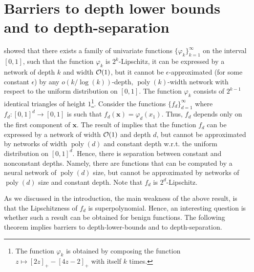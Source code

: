 \documentclass[11pt]{article}
\newcommand{\bx}{\mathbf{x}}
\newcommand{\co}{{\cal O}}
\DeclareMathOperator{\poly}{poly}
\begin{document}
\section{Barriers to depth lower bounds and to depth-separation}
\label{sec:barriers depth}

\cite{telgarsky2016benefits} showed that there exists a family of univariate functions $\{\varphi_k\}_{k=1}^\infty$ on the interval $[0,1]$, such that the function $\varphi_k$ is $2^k$-Lipschitz, it can be expressed by a network of depth $k$ and width $\co(1)$, but it cannot be $\epsilon$-approximated (for some constant $\epsilon$) by any $o(k/\log(k))$-depth, $\poly(k)$-width network with respect to the uniform distribution on $[0,1]$.
The function $\varphi_k$ consists of $2^{k-1}$ identical triangles of height $1$\footnote{The function $\varphi_k$ is obtained by composing the function $z \mapsto [2z]_+ - [4z-2]_+$ with itself $k$ times.}.
Consider the functions $\{f_d\}_{d=1}^\infty$ where $f_d:[0,1]^d \rightarrow [0,1]$ is such that $f_d(\bx) = \varphi_d(x_1)$. Thus, $f_d$ depends only on the first component of $\bx$.
The result of \cite{telgarsky2016benefits} implies that the function $f_d$ can be expressed by a network of width $\co(1)$ and depth $d$, but cannot be approximated by networks of width $\poly(d)$ and constant depth w.r.t. the uniform distribution on $[0,1]^d$. Hence, there is separation between constant and nonconstant depths. Namely, there are functions that can be computed by a neural network of $\poly(d)$ size, but cannot be approximated by networks of $\poly(d)$ size and constant depth. 
Note that $f_d$ is $2^d$-Lipschitz.


As we discussed in the introduction, the main weakness of the above result, is that the Lipschitzness of $f_d$ is superpolynomial. 
Hence, an interesting question is whether such a result can be obtained for benign functions. 
The following theorem implies barriers to depth-lower-bounds and to depth-separation.
\end{document}
